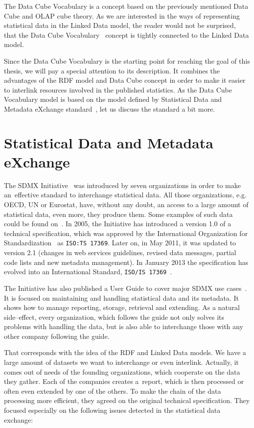 The Data Cube Vocabulary is a concept based on the previously mentioned Data Cube and
OLAP cube theory. As we are interested in the ways of representing statistical data in the
Linked Data model, the reader would not be surprised, that the Data Cube 
Vocabulary~\cite{dcv}
concept is tightly connected to the Linked Data model.

Since the Data Cube Vocabulary is the starting point for reaching the goal of this thesis,
we will pay a special attention to its description. It combines the advantages of the RDF
model and Data Cube concept in order to make it easier to interlink resources involved
in the published statistics. As the Data Cube Vocabulary model is based on the model defined
by Statistical Data and Metadata eXchange standard~\cite{sdmx}, let us discuss the standard a bit more.

\section{Statistical Data and Metadata eXchange}
The SDMX Initiative~\cite{sdmx} was introduced by seven organizations in order to make
an~effective standard to interchange statistical data. All those organizations, e.g. OECD,
UN or Eurostat, have, without any doubt, an access to a large amount of statistical data, even more,
they produce them. Some examples of such data could be found on~\cite{pubdata}.
In 2005, the Initiative has introduced a
version 1.0 of a technical specification, which was approved by the International
Organization for Standardization~\cite{iso} as \texttt{ISO:TS 17369}.
Later on, in May 2011, it was updated to version 2.1 (changes in web services guidelines,
revised data messages, partial code lists and new metadata management).
In January 2013 the specification has evolved into an International Standard,
\texttt{ISO/IS 17369}~\cite{isosdmx}.

The Initiative has also published a User Guide to cover major SDMX use cases~\cite{sdmxuserguide}.
It is focused on maintaining and handling statistical data and its metadata. It shows
how to manage reporting, storage, retrieval and extending. As a natural side--effect,
every organization, which follows the guide not only solves its problems with
handling the data, but is also able to interchange those with any other company
following the guide.

That corresponds with the idea of the RDF and Linked Data models. We have a large amount
of datasets we want to interchange or even interlink. Actually, it comes out of needs
of the founding organizations, which cooperate on the data they gather. Each of the companies creates
a~report, which is then processed or often even extended by one of the others. To make the chain
of the data processing more efficient, they agreed on the original technical specification.
They focused especially on the following issues detected in the statistical data exchange:

